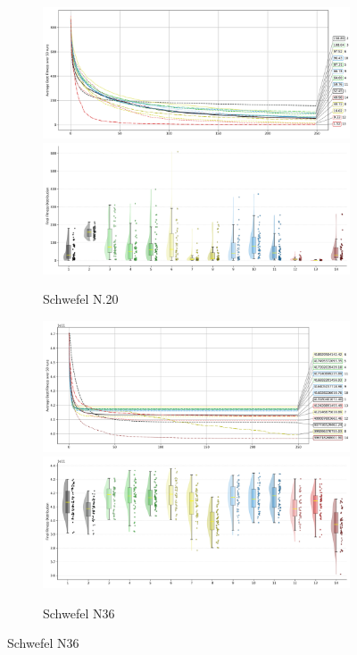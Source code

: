 \begin{figure}[p]\ContinuedFloat
\renewcommand\thesubfigure{C.\arabic{figure}.\arabic{subfigure}} %
    \centering

\begin{subfigure}{1\textwidth}
    \centering
    \includegraphics[width=.49\textwidth]{Figures/results/1000/Schwefel_N20_All_selected_algorithms_dim1000_annot_legend.png}
    \includegraphics[width=.49\textwidth]{Figures/results/1000/Schwefel_N20_all_dim1000_raincloud_vertical.png}
    \caption{Schwefel N.20}
\end{subfigure}

\begin{subfigure}{1\textwidth}
    \centering
    \includegraphics[width=.49\textwidth]{Figures/results/1000/Schwefel_N36_All_selected_algorithms_dim1000_annot_legend.png}
    \includegraphics[width=.49\textwidth]{Figures/results/1000/Schwefel_N36_all_dim1000_raincloud_vertical.png}
    \caption{Schwefel N36}
\end{subfigure}


\end{figure}
